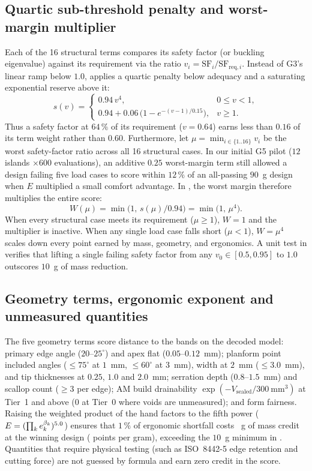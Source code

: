 \subsection{Quartic sub-threshold penalty and worst-margin multiplier}
Each of the 16 structural terms compares its safety factor (or buckling eigenvalue) against its requirement via the ratio
$v_i = \mathrm{SF}_i / \mathrm{SF}_{\mathrm{req},i}$. Instead of G3's linear ramp below $1.0$,  applies a
quartic penalty below adequacy and a saturating exponential reserve above it:
\begin{equation}
s(v) = \begin{cases}
0.94\,v^4, & 0 \le v < 1, \\
0.94 + 0.06\,\bigl(1 - e^{-(v - 1)/0.15}\bigr), & v \ge 1.
\end{cases}
\end{equation}
Thus a safety factor at $64\,\%$ of its requirement ($v = 0.64$) earns less than $0.16$ of its term weight rather than $0.60$.
Furthermore, let $\mu = \min_{i \in \{1..16\}} v_i$ be the worst safety-factor ratio across all 16 structural cases. In our
initial G5 pilot ($12$ islands $\times 600$ evaluations), an additive $0.25$ worst-margin term still allowed a design failing
five load cases to score within $12\,\%$ of an all-passing $90$~g design when $E$ multiplied a small comfort advantage.
In , the worst margin therefore multiplies the entire score:
\begin{equation}
W(\mu) = \min\bigl(1,\, s(\mu)/0.94\bigr) = \min\bigl(1,\, \mu^4\bigr).
\end{equation}
When every structural case meets its requirement ($\mu \ge 1$), $W = 1$ and the multiplier is inactive. When any single load
case falls short ($\mu < 1$), $W = \mu^4$ scales down every point earned by mass, geometry, and ergonomics. A unit test in
 verifies that lifting a single failing safety factor from any
$v_0 \in [0.5, 0.95]$ to $1.0$ outscores $10$~g of mass reduction.

\subsection{Geometry terms, ergonomic exponent and unmeasured quantities}
The five geometry terms score distance to the  bands on the decoded model: primary edge angle
($20$--$25^\circ$) and apex flat ($0.05$--$0.12$~mm); planform point included angles ($\le 75^\circ$ at $1$~mm, $\le 60^\circ$
at $3$~mm), width at $2$~mm ($\le 3.0$~mm), and tip thicknesses at $0.25$, $1.0$ and $2.0$~mm; serration depth ($0.8$--$1.5$~mm)
and scallop count ($\ge 3$ per edge); AM build drainability $\exp(-V_\mathrm{sealed}/300~\mathrm{mm^3})$ at Tier~1 and above
($0$ at Tier~0 where voids are unmeasured); and form fairness. Raising the weighted product of the hand factors to the fifth power ($E = (\prod_k e_k^{\beta_k})^{5.0}$) ensures that $1\,\%$ of
ergonomic shortfall costs \gGramsPerPctE{}~g of mass credit at the winning design (\gPtsPerGram{} points per gram), exceeding
the $10$~g minimum in . Quantities that require physical testing (such as ISO~8442-5 edge retention and
cutting force) are not guessed by formula and earn zero credit in the score.
